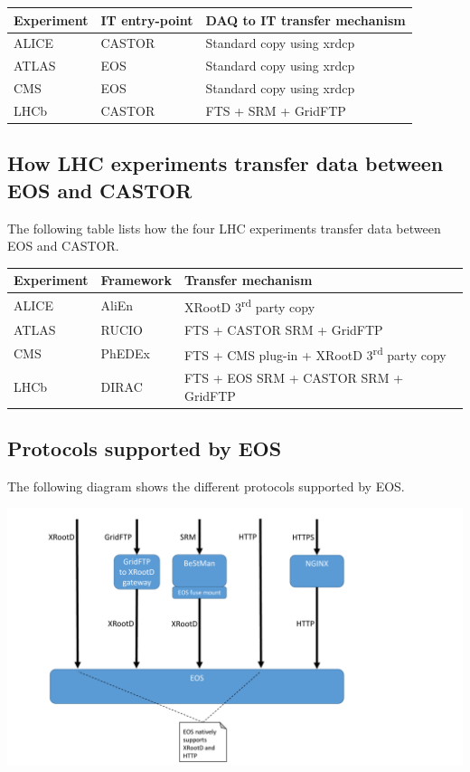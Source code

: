 \documentclass{article}
\begin{document}
\begin{tabular}{|l|l|l|}
	\hline
	Experiment & IT entry-point & DAQ to IT transfer mechanism \\
	\hline
	\hline
	ALICE      & CASTOR         & Standard copy using xrdcp    \\
	\hline
	ATLAS      & EOS            & Standard copy using xrdcp    \\
	\hline
	CMS        & EOS            & Standard copy using xrdcp    \\
	\hline
	LHCb       & CASTOR         & FTS + SRM + GridFTP          \\
	\hline
\end{tabular}


\subsection{How LHC experiments transfer data between EOS and CASTOR}
The following table lists how the four LHC experiments transfer data between EOS and CASTOR.

\begin{tabular}{|l|l|l|}
	\hline
	Experiment & Framework & Transfer mechanism                                          \\
	\hline
	\hline
	ALICE      & AliEn     & XRootD 3\textsuperscript{rd} party copy                     \\
	\hline
	ATLAS      & RUCIO     & FTS + CASTOR SRM + GridFTP                                  \\
	\hline
	CMS        & PhEDEx    & FTS + CMS plug-in + XRootD 3\textsuperscript{rd} party copy \\
	\hline
	LHCb       & DIRAC     & FTS + EOS SRM + CASTOR SRM + GridFTP                        \\
	\hline
\end{tabular}

\subsection{Protocols supported by EOS}

The following diagram shows the different protocols supported by EOS.

\includegraphics[width=\linewidth]{EOS_supported_protocols}
\end{document}
